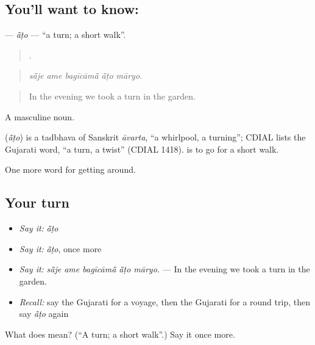 \subsection*{You'll want to know: }
\textbf{} — \emph{ā̃ṭo} — \textquotedblleft{}a turn; a short walk\textquotedblright{}.

\begin{quote}
    .
\end{quote}

\begin{quote}
\emph{sā̃je ame bagīcāmā̃ ā̃ṭo māryo.}
\end{quote}

\begin{quote}
In the evening we took a turn in the garden.
\end{quote}

A masculine noun.

\begin{cousinweb}
\textbf{} (\emph{ā̃ṭo}) is a tadbhava of Sanskrit \emph{āvarta}, \textquotedblleft{}a whirlpool, a turning\textquotedblright{}; CDIAL lists the Gujarati word, \textquotedblleft{}a turn, a twist\textquotedblright{} (CDIAL 1418).   is to go for a short walk.
\end{cousinweb}

\begin{grammarlens}[title={What you've built}]
One more word for getting around.
\end{grammarlens}

\subsection*{Your turn}
\begin{itemize}
\raggedright
  \item \emph{Say it:} \emph{ā̃ṭo}
  \item \emph{Say it:} \emph{ā̃ṭo}, once more
  \item \emph{Say it:} \emph{sā̃je ame bagīcāmā̃ ā̃ṭo māryo.} — In the evening we took a turn in the garden.
  \item \emph{Recall:} say the Gujarati for a voyage, then the Gujarati for a round trip, then say \emph{ā̃ṭo} again
\end{itemize}

\begin{tcolorbox}[breakable,colback=teal!4,colframe=teal!35!black,title={Before you move on}]
What does  mean? (\textquotedblleft{}A turn; a short walk\textquotedblright{}.) Say it once more.
\end{tcolorbox}
